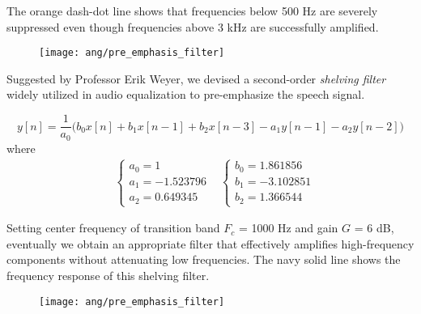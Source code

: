 
\begin{frame}
The \textcolor{orange_matlab}{orange dash-dot line} shows that frequencies below 500 Hz are severely suppressed even though frequencies above 3 kHz are successfully amplified.

\begin{figure}[H]
\centering
\texttt{[image: ang/pre\_emphasis\_filter]}
\end{figure}
\end{frame}


\begin{frame}
Suggested by Professor Erik Weyer, we devised a second-order \textit{shelving filter} widely utilized in audio equalization to pre-emphasize the speech signal.

\begin{equation}
\label{shelving-filter}
y[n] = \frac{1}{a_0} \Big( b_0 x[n] + b_1 x[n-1] + b_2 x[n-3] - a_1 y[n-1] - a_2 y[n-2] \Big)
\end{equation}
where
\begin{align}
\label{shleving-coef}
&\begin{cases}
a_0 = 1\\
a_1 = -1.523796\\
a_2 = 0.649345
\end{cases}
&\begin{cases}
b_0 = 1.861856\\
b_1 = -3.102851\\
b_2 = 1.366544
\end{cases}
\end{align}
\end{frame}


\begin{frame}
Setting center frequency of transition band $F_c$ = 1000 Hz and gain $G$ = 6 dB, eventually we obtain an appropriate filter that effectively amplifies high-frequency components without attenuating low frequencies. The \textcolor{navy_matlab}{navy solid line} shows the frequency response of this shelving filter.

\begin{figure}[H]
\centering
\texttt{[image: ang/pre\_emphasis\_filter]}
\end{figure}
\end{frame}

